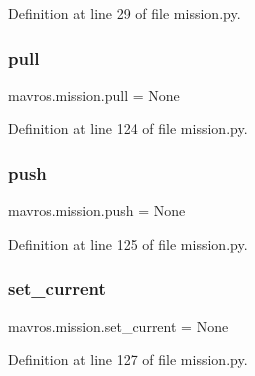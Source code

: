 Definition at line 29 of file mission.\+py.

\mbox{\label{namespacemavros_1_1mission_af4eb6d7b6e756f2d9c71623fb0bf4546}} 
\subsubsection{\texorpdfstring{pull}{pull}}
{\footnotesize\ttfamily mavros.\+mission.\+pull = None}



Definition at line 124 of file mission.\+py.

\mbox{\label{namespacemavros_1_1mission_af118ce1d2eed088eebd56ec7aaa2d8c6}} 
\subsubsection{\texorpdfstring{push}{push}}
{\footnotesize\ttfamily mavros.\+mission.\+push = None}



Definition at line 125 of file mission.\+py.

\mbox{\label{namespacemavros_1_1mission_ab368586c0e52ea1ac8ac95147a099cd7}} 
\subsubsection{\texorpdfstring{set\_current}{set\_current}}
{\footnotesize\ttfamily mavros.\+mission.\+set\+\_\+current = None}



Definition at line 127 of file mission.\+py.

